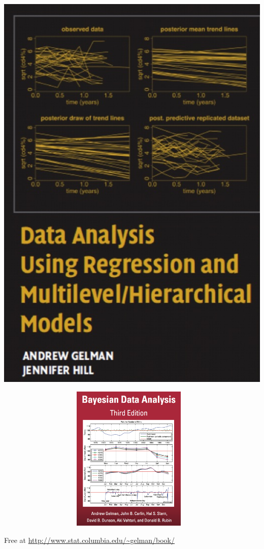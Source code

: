 \documentclass[
  ignorenonframetext,
  aspectratio=169]{beamer}
\begin{document}
\begin{frame}
\begin{center}\includegraphics[width=7.17in]{img/gelmanhill} \end{center}
\end{frame}

\begin{frame}
\begin{center}\includegraphics[width=13cm,height=7cm]{img/bda_cover} \end{center}

Free at \url{http://www.stat.columbia.edu/~gelman/book/}
\end{frame}
\end{document}
